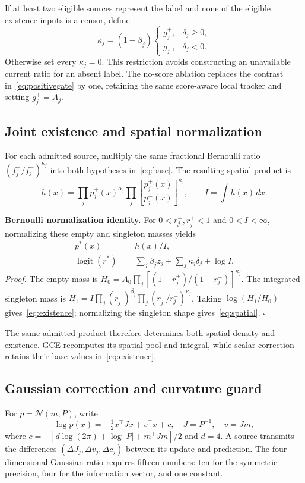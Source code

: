 If at least two eligible sources represent the label and none of the
eligible existence inputs is a censor, define
\begin{equation}
 \kappa_j=(1-\beta_j)
 \begin{cases}g_j^+,&\delta_j\geq0,\\g_j^-,&\delta_j<0.
 \end{cases}
 \label{eq:kappa}
\end{equation}
Otherwise set every $\kappa_j=0$. This restriction avoids constructing an
unavailable current ratio for an absent label. The no-score ablation
replaces the contrast in~\eqref{eq:positivegate} by one, retaining the
same score-aware local tracker and setting $g_j^+=A_j$.

\subsection{Joint existence and spatial normalization}
For each admitted source, multiply the same fractional Bernoulli ratio
$(f_j^+/f_j^-)^{\kappa_j}$ into both hypotheses in~\eqref{eq:base}.
The resulting spatial product is
\begin{equation}
 h(x)=\prod_jp_j^+(x)^{\alpha_j}
       \prod_j\left[\frac{p_j^+(x)}{p_j^-(x)}\right]^{\kappa_j},
 \qquad I=\int h(x)\,dx.
 \label{eq:product}
\end{equation}

\noindent\textbf{Bernoulli normalization identity.}
For $0<r_j^-,r_j^+<1$ and $0<I<\infty$, normalizing
these empty and singleton masses yields
\begin{align}
 p^*(x)&=h(x)/I,\label{eq:spatial}\\
 \operatorname{logit}(r^*)&=\sum_j\beta_j z_j+
                    \sum_j\kappa_j\delta_j+\log I.
                    \label{eq:existence}
\end{align}
\emph{Proof.} The empty mass is
$H_0=A_0\prod_j[(1-r_j^+)/(1-r_j^-)]^{\kappa_j}$.
The integrated singleton mass is
$H_1=I\prod_j(r_j^+)^{\beta_j}
       \prod_j(r_j^+/r_j^-)^{\kappa_j}$.
Taking $\log(H_1/H_0)$ gives~\eqref{eq:existence}; normalizing the
singleton shape gives~\eqref{eq:spatial}. $\square$

The same admitted product therefore determines both spatial density and
existence. GCE recomputes its spatial pool and integral, while scalar
correction retains their base values in~\eqref{eq:existence}.

\subsection{Gaussian correction and curvature guard}
For $p=\mathcal N(m,P)$, write
\begin{equation}
 \log p(x)=-\tfrac12x^\top Jx+v^\top x+c,
 \quad J=P^{-1},\quad v=Jm,
\end{equation}
where $c=-[d\log(2\pi)+\log|P|+m^\top Jm]/2$ and $d=4$.
A source transmits the differences
$(\Delta J_j,\Delta v_j,\Delta c_j)$ between its update and prediction.
The four-dimensional Gaussian ratio requires fifteen numbers: ten for the
symmetric precision, four for the information vector, and one constant.

